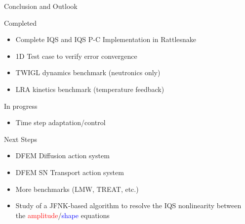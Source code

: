 \documentclass[8pt]{beamer}
\newcommand{\bi}{\begin{itemize}}
\newcommand{\ei}{\end{itemize}}
\newcommand{\tcr}[1]{\textcolor{red}{#1}}
\newcommand{\tcb}[1]{\textcolor{blue}{#1}}
\begin{document}
\begin{frame}{Conclusion and Outlook}

\begin{block}{Completed}
\bi
\item Complete IQS and IQS P-C Implementation in Rattlesnake
\item 1D Test case to verify error convergence
\item TWIGL dynamics benchmark (neutronics only)
\item LRA kinetics benchmark (temperature feedback)
\ei
\end{block}

\begin{block}{In progress}
\bi
\item Time step adaptation/control
\ei
\end{block}
\begin{block}{Next Steps}
\bi
\item DFEM Diffusion action system
\item DFEM SN Transport action system
\item More benchmarks (LMW, TREAT, etc.)
\item Study of a JFNK-based algorithm to resolve the IQS nonlinearity between the \tcr{amplitude}/\tcb{shape} equations
\ei
\end{block}

\end{frame}
\end{document}
